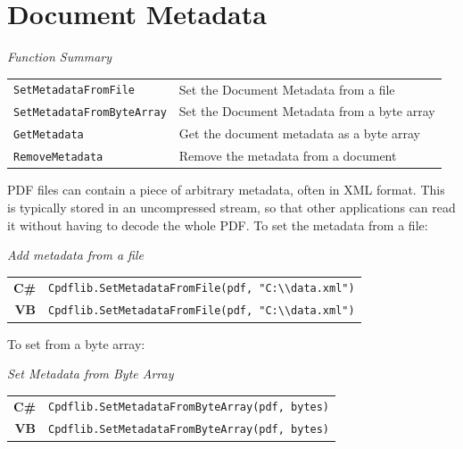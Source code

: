\documentclass[a4paper]{memoir}
\begin{document}
\chapter{Document Metadata}
\begin{framed}
\noindent\textit{Function Summary}\\[2mm]
\noindent\begin{tabular}{ll}
\verb!SetMetadataFromFile! & Set the Document Metadata from a file\\
\verb!SetMetadataFromByteArray! & Set the Document Metadata from a byte array\\
\verb!GetMetadata! & Get the document metadata as a byte array\\
\verb!RemoveMetadata! & Remove the metadata from a document\\
\end{tabular}
\end{framed}
  PDF files can contain a piece of arbitrary metadata, often in XML format.
This is typically stored in an uncompressed stream, so that other applications
can read it without having to decode the whole PDF. To set the metadata from a file:
\begin{framed}
\noindent\textit{Add metadata from a file}

\vspace{2mm}
\noindent\begin{tabular}{rl}
\small\sffamily\textbf{C\#} &
\begin{minipage}{4in}
\small\verb!Cpdflib.SetMetadataFromFile(pdf, "C:\\data.xml")!
\end{minipage}\\[5mm]
\small\sffamily\textbf{VB} &
\begin{minipage}{4in}
\small\verb!Cpdflib.SetMetadataFromFile(pdf, "C:\\data.xml")!
\end{minipage}\\[5mm]
\end{tabular}
\end{framed}

To set from a byte array:

\begin{framed}
\noindent\textit{Set Metadata from Byte Array}

\vspace{2mm}
\noindent\begin{tabular}{rl}
\small\sffamily\textbf{C\#} &
\begin{minipage}{4in}
\small\verb!Cpdflib.SetMetadataFromByteArray(pdf, bytes)!
\end{minipage}\\[5mm]
\small\sffamily\textbf{VB} &
\begin{minipage}{4in}
\small\verb!Cpdflib.SetMetadataFromByteArray(pdf, bytes)!
\end{minipage}\\[5mm]
\end{tabular}
\end{framed}
\end{document}
